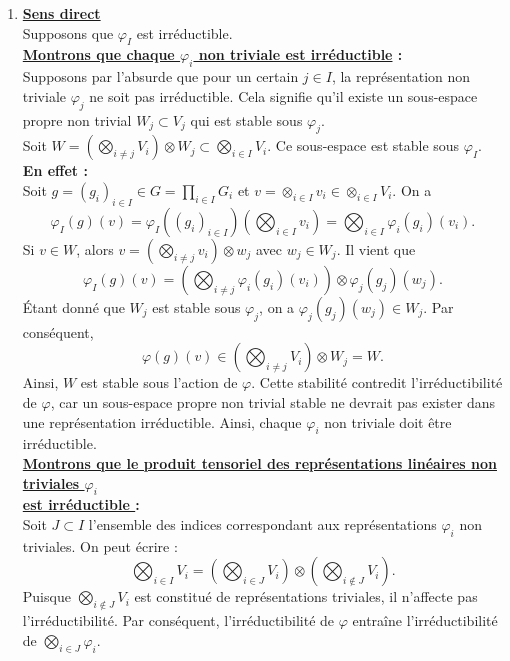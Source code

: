 \documentclass[a4paper, 14pt]{report}
\begin{document}
\begin{onehalfspace}
{\begin{enumerate} [label=\roman*)]
	\item  \textbf{\underline{Sens direct}}\\
Supposons que \( \varphi_I \) est irréductible.\\ 		
	\textbf{\underline{Montrons que chaque \( \varphi_i \) non triviale est irréductible} :}\\
Supposons par l'absurde que pour un certain \( j \in I \), la représentation non triviale \( \varphi_j \) ne soit pas irréductible.  Cela signifie qu'il existe un sous-espace propre non trivial \( W_j \subset V_j \) qui est stable sous \( \varphi_j \).\\
	Soit
	\(
	W = \left( \bigotimes_{i \neq j} V_i \right) \otimes W_j \subset \bigotimes_{i \in I} V_i.
	\)
	Ce sous-espace est stable sous \( \varphi_I \).\\
	\textbf{En effet :}\\
Soit \( g = (g_i)_{i \in I} \in G = \prod_{i \in I} G_i \) et \( v=\otimes_{i \in I} v_i \in \otimes_{i \in I} V_i\). On a
	\[
	\varphi_I(g)(v) = \varphi_I((g_i)_{i \in I})\left( \bigotimes_{i \in I} v_i \right) = \bigotimes_{i \in I} \varphi_i(g_i)(v_i).
	\]
Si \( v \in W \), alors \( v = \left( \bigotimes_{i \neq j} v_i \right) \otimes w_j \) avec \( w_j \in W_j \). Il vient que
	\[
	\varphi_I(g)(v) = \left( \bigotimes_{i \neq j} \varphi_i(g_i)(v_i) \right) \otimes \varphi_j(g_j)(w_j).
	\]
Étant donné que \( W_j \) est stable sous \( \varphi_j \), on a \( \varphi_j(g_j)(w_j) \in W_j \). Par conséquent,	
	\[
	\varphi(g)(v) \in \left( \bigotimes_{i \neq j} V_i \right) \otimes W_j = W.
	\]
Ainsi, \( W \) est stable sous l'action de \( \varphi \). Cette stabilité contredit l'irréductibilité de \( \varphi \), car un sous-espace propre non trivial stable ne devrait pas exister dans une représentation irréductible.
Ainsi, chaque \( \varphi_i \) non triviale doit être irréductible.\\
	
	\textbf{\underline{Montrons que le produit tensoriel des représentations linéaires non triviales  \( \varphi_i \)  }}\\
	\textbf{\underline{ est irréductible } :}\\			 
Soit \( J \subset I \) l'ensemble des indices correspondant aux représentations \( \varphi_i \) non triviales.  
	On peut écrire :
	\[
	\bigotimes_{i \in I} V_i = \left( \bigotimes_{i \in J} V_i \right) \otimes \left( \bigotimes_{i \notin J} V_i \right).
	\]
Puisque \( \bigotimes_{i \notin J} V_i \) est constitué de représentations triviales, il n’affecte pas l'irréductibilité. Par conséquent, l'irréductibilité de \( \varphi \) entraîne l'irréductibilité de \( \bigotimes_{i \in J} \varphi_i \).\\
	

\end{enumerate}}
\end{onehalfspace}
\end{document}

